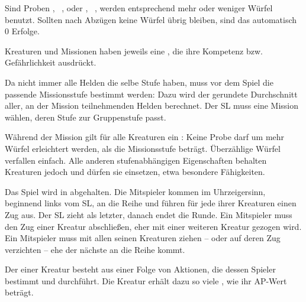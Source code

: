 {		\noindent
		Sind Proben , \zB~, oder , \zB~, werden entsprechend mehr oder weniger Würfel benutzt. Sollten nach Abzügen keine Würfel übrig bleiben, sind das automatisch 0 Erfolge.


		Kreaturen und Missionen haben jeweils eine , die ihre Kompetenz bzw. Gefährlichkeit ausdrückt.

		Da nicht immer alle Helden die selbe Stufe haben, muss vor dem Spiel die passende Missionsstufe bestimmt werden: Dazu wird der gerundete Durchschnitt aller, an der Mission teilnehmenden Helden berechnet. Der SL muss eine Mission wählen, deren Stufe zur Gruppenstufe passt.


		\noindent
		Während der Mission gilt für alle Kreaturen ein : Keine Probe darf um mehr Würfel erleichtert werden, als die Missionsstufe beträgt. Überzählige Würfel verfallen einfach. Alle anderen stufenabhängigen Eigenschaften behalten Kreaturen jedoch und dürfen sie einsetzen, etwa besondere Fähigkeiten.


		Das Spiel wird in  abgehalten. Die Mitspieler kommen im Uhrzeigersinn, beginnend links vom SL, an die Reihe und führen für jede ihrer Kreaturen einen Zug aus. Der SL zieht als letzter, danach endet die Runde. Ein Mitspieler muss den Zug einer Kreatur abschließen, eher mit einer weiteren Kreatur gezogen wird. Ein Mitspieler muss mit allen seinen Kreaturen ziehen -- oder auf deren Zug verzichten -- ehe der nächste an die Reihe kommt.

		Der  einer Kreatur besteht aus einer Folge von Aktionen, die dessen Spieler bestimmt und durchführt. Die Kreatur erhält dazu so viele , wie ihr AP-Wert beträgt.

}
